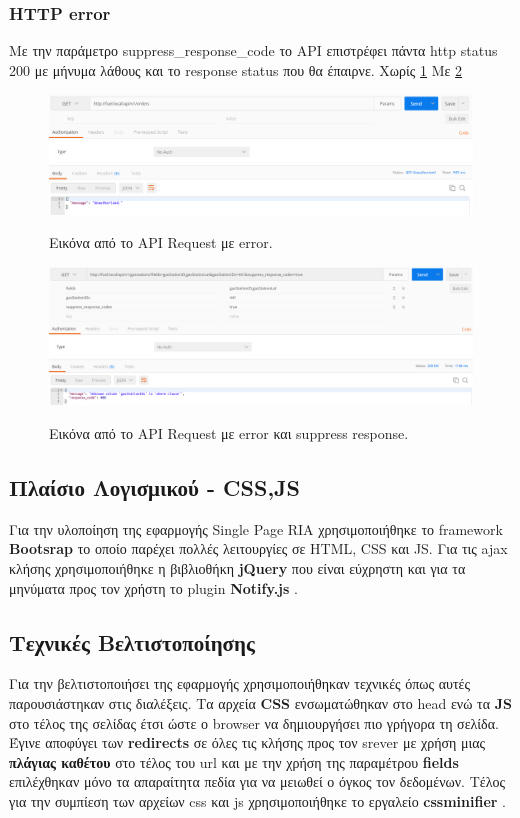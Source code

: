 \subsubsection{HTTP error}
Με την παράμετρο suppress\_response\_code το API επιστρέφει πάντα http status 200 με μήνυμα λάθους και το response status που θα έπαιρνε. Χωρίς \ref{fig:error} Με \ref{fig:suppress}

\begin{figure}[H]
  \caption{Εικόνα από το API Request με error.}
  \centering
    \includegraphics[width=1\textwidth]{img/error.png}
    \label{fig:error}
\end{figure}

\begin{figure}[H]
  \caption{Εικόνα από το API Request με error και suppress response.}
  \centering
    \includegraphics[width=1\textwidth]{img/suppress.png}
    \label{fig:suppress}
\end{figure}

\subsection{Πλαίσιο Λογισμικού - CSS,JS}
Για την υλοποίηση της εφαρμογής Single Page RIA χρησιμοποιήθηκε το framework \textbf{Βootsrap} \cite{bootstrap}
το οποίο παρέχει πολλές λειτουργίες σε HTML, CSS και JS. Για τις ajax κλήσης χρησιμοποιήθηκε η βιβλιοθήκη \textbf{jQuery} \cite{jquery} που είναι εύχρηστη και για τα μηνύματα προς τον χρήστη το plugin \textbf{Notify.js} \cite{notify}.

\subsection{Τεχνικές Βελτιστοποίησης}
Για την βελτιστοποιήσει της εφαρμογής χρησιμοποιήθηκαν τεχνικές όπως αυτές παρουσιάστηκαν στις διαλέξεις. Τα αρχεία \textbf{CSS} ενσωματώθηκαν στο head ενώ τα \textbf{JS} στο τέλος της σελίδας έτσι ώστε ο browser να δημιουργήσει πιο γρήγορα τη σελίδα. Έγινε αποφύγει των \textbf{redirects} σε όλες τις κλήσης προς τον srever με χρήση μιας \textbf{πλάγιας καθέτου} στο τέλος του url και με την χρήση της παραμέτρου \textbf{fields} επιλέχθηκαν μόνο τα απαραίτητα πεδία για να μειωθεί ο όγκος τον δεδομένων. Τέλος για την συμπίεση των αρχείων css και js χρησιμοποιήθηκε το εργαλείο \textbf{cssminifier} \cite{cssminifier}.

